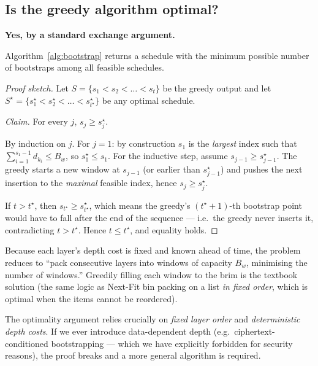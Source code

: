 \documentclass[11pt,a4paper]{article}
\begin{document}
\subsection{Is the greedy algorithm optimal?}
\textbf{Yes, by a standard exchange argument.}

\begin{theorem}
Algorithm~\ref{alg:bootstrap} returns a schedule with the minimum
possible number of bootstraps among all feasible schedules.
\end{theorem}

\begin{proof}[Proof sketch]
Let $S = \{s_1 < s_2 < \dots < s_t\}$ be the greedy output and let
$S^\star = \{s^\star_1 < s^\star_2 < \dots < s^\star_{t^\star}\}$ be
any optimal schedule.

\emph{Claim.} For every $j$, $s_j \ge s^\star_j$.

By induction on $j$. For $j=1$: by construction $s_1$ is the
\emph{largest} index such that $\sum_{i=1}^{s_1 - 1} d_{k_i} \le B_w$,
so $s^\star_1 \le s_1$. For the inductive step, assume $s_{j-1} \ge
s^\star_{j-1}$. The greedy starts a new window at $s_{j-1}$ (or
earlier than $s^\star_{j-1}$) and pushes the next insertion to the
\emph{maximal} feasible index, hence $s_j \ge s^\star_j$.

If $t > t^\star$, then $s_{t^\star} \ge s^\star_{t^\star}$, which means
the greedy's $(t^\star+1)$-th bootstrap point would have to fall after
the end of the sequence — i.e.\ the greedy never inserts it,
contradicting $t > t^\star$. Hence $t \le t^\star$, and equality holds.
\end{proof}

\begin{intuition}
Because each layer's depth cost is fixed and known ahead of time, the
problem reduces to ``pack consecutive layers into windows of capacity
$B_w$, minimising the number of windows.'' Greedily filling each
window to the brim is the textbook solution (the same logic as
Next-Fit bin packing on a list \emph{in fixed order}, which is
optimal when the items cannot be reordered).
\end{intuition}

\begin{warning}
The optimality argument relies crucially on \emph{fixed layer order}
and \emph{deterministic depth costs}. If we ever introduce
data-dependent depth (e.g.\ ciphertext-conditioned bootstrapping —
which we have explicitly forbidden for security reasons), the proof
breaks and a more general algorithm is required.
\end{warning}
\end{document}
